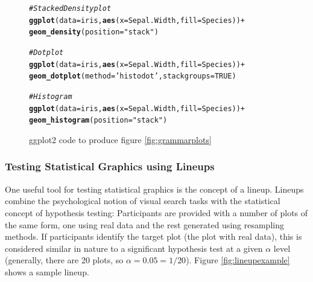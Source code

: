 \documentclass[11pt]{isuthesis}\usepackage[]{graphicx}\usepackage[]{color}
\makeatletter
\newcommand{\hlnum}[1]{\textcolor[rgb]{0.686,0.059,0.569}{#1}}%
\newcommand{\hlstr}[1]{\textcolor[rgb]{0.192,0.494,0.8}{#1}}%
\newcommand{\hlcom}[1]{\textcolor[rgb]{0.678,0.584,0.686}{\textit{#1}}}%
\newcommand{\hlopt}[1]{\textcolor[rgb]{0,0,0}{#1}}%
\newcommand{\hlstd}[1]{\textcolor[rgb]{0.345,0.345,0.345}{#1}}%
\newcommand{\hlkwc}[1]{\textcolor[rgb]{0.333,0.667,0.333}{#1}}%
\newcommand{\hlkwd}[1]{\textcolor[rgb]{0.737,0.353,0.396}{\textbf{#1}}}%
\newenvironment{kframe}{%
 \def\at@end@of@kframe{}%
 \ifinner\ifhmode%
  \def\at@end@of@kframe{\end{minipage}}%
  \begin{minipage}{\columnwidth}%
 \fi\fi%
 \def\FrameCommand##1{\hskip\@totalleftmargin \hskip-\fboxsep
 \colorbox{shadecolor}{##1}\hskip-\fboxsep
     \hskip-\linewidth \hskip-\@totalleftmargin \hskip\columnwidth}%
 \MakeFramed {\advance\hsize-\width
   \@totalleftmargin\z@ \linewidth\hsize
   \@setminipage}}%
 {\par\unskip\endMakeFramed%
 \at@end@of@kframe}
\newenvironment{knitrout}{}{} %
\makeatother
\begin{document}
\begin{figure}[htbp]\centering
\begin{knitrout}
\color{fgcolor}\begin{kframe}
\begin{alltt}
\hlcom{# Stacked Density plot}
\hlkwd{ggplot}\hlstd{(}\hlkwc{data}\hlstd{=iris,} \hlkwd{aes}\hlstd{(}\hlkwc{x}\hlstd{=Sepal.Width,} \hlkwc{fill}\hlstd{=Species))} \hlopt{+}
  \hlkwd{geom_density}\hlstd{(}\hlkwc{position}\hlstd{=}\hlstr{"stack"}\hlstd{)}

\hlcom{# Dotplot }
\hlkwd{ggplot}\hlstd{(}\hlkwc{data}\hlstd{=iris,} \hlkwd{aes}\hlstd{(}\hlkwc{x}\hlstd{=Sepal.Width,} \hlkwc{fill}\hlstd{=Species))} \hlopt{+}
  \hlkwd{geom_dotplot}\hlstd{(}\hlkwc{method}\hlstd{=}\hlstr{'histodot'}\hlstd{,} \hlkwc{stackgroups}\hlstd{=}\hlnum{TRUE}\hlstd{)}

\hlcom{# Histogram}
\hlkwd{ggplot}\hlstd{(}\hlkwc{data}\hlstd{=iris,} \hlkwd{aes}\hlstd{(}\hlkwc{x}\hlstd{=Sepal.Width,} \hlkwc{fill}\hlstd{=Species))} \hlopt{+}
  \hlkwd{geom_histogram}\hlstd{(}\hlkwc{position}\hlstd{=}\hlstr{"stack"}\hlstd{)}
\end{alltt}
\end{kframe}
\end{knitrout}
\caption{ggplot2 code to produce figure \protect\ref{fig:grammarplots}}\label{fig:grammarcode}
\end{figure}

\subsubsection{Testing Statistical Graphics using Lineups}
One useful tool for testing statistical graphics is the concept of a lineup. Lineups combine the psychological notion of visual search tasks with the statistical concept of hypothesis testing: Participants are provided with a number of plots of the same form, one using real data and the rest generated using resampling methods. If participants identify the target plot (the plot with real data), this is considered similar in nature to a significant hypothesis test at a given $\alpha$ level (generally, there are 20 plots, so $\alpha=0.05 = 1/20$). Figure \ref{fig:lineupexample} shows a sample lineup. 
\end{document}
